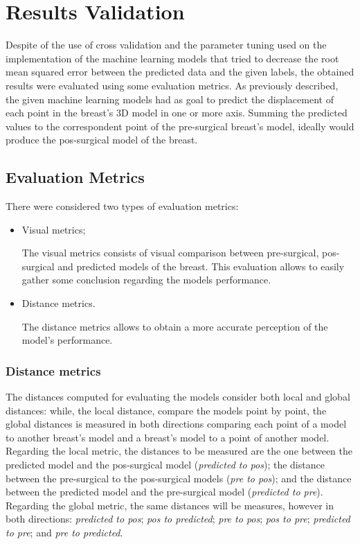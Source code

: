 \section{Results Validation}

Despite of the use of cross validation and the parameter tuning used on the implementation of the machine learning models that tried to decrease the root mean squared error between the predicted data and the given labels, the obtained results were evaluated using some evaluation metrics. As previously described, the given machine learning models had as goal to predict the displacement of each point in the breast's 3D model in one or more axis. Summing the predicted values to the correspondent point of the pre-surgical breast's model, ideally would produce the pos-surgical model of the breast.

\subsection{Evaluation Metrics}

There were considered two types of evaluation metrics:
\begin{itemize}
\item Visual metrics;

The visual metrics consists of visual comparison between pre-surgical, pos-surgical and predicted models of the breast. This evaluation allows to easily gather some conclusion regarding the models performance.

\item Distance metrics.

The distance metrics allows to obtain a more accurate perception of the model's performance.
\end{itemize}

\subsubsection{Distance metrics}

The distances computed for evaluating the models consider both local and global distances: while, the local distance, compare the models point by point, the global distances is measured in both directions comparing each point of a model to another breast's model and a breast's model to a point of another model. Regarding the local metric, the distances to be measured are the one between the predicted model and the pos-surgical model (\textit{predicted to pos}); the distance between the pre-surgical to the pos-surgical models (\textit{pre to pos}); and the distance between the predicted model and the pre-surgical model (\textit{predicted to pre}). Regarding the global metric, the same distances will be measures, however in both directions: \textit{predicted to pos}; \textit{pos to predicted}; \textit{pre to pos}; \textit{pos to pre}; \textit{predicted to pre}; and \textit{pre to predicted}. 

